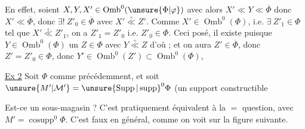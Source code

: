 
En effet, soient $X,Y,X'\in\operatorname{Omb}^{0}(\unsure{\Phi|\varphi})$ avec
alors $X'\ll Y\ll\overline\Phi$ donc $X'\ll\overline\Phi$, donc $\exists!\ Z'_0\in\overline\Phi$ avec $X'\overset{\circ}{\ll}Z'$. Comme $X'\in\operatorname{Omb}^{0}(\Phi)$, i.e. $\exists\ Z'_1\in\Phi$ tel que $X'\overset{\circ}{\ll}Z'_1$, on a $Z'_1=Z'_0$ i.e. $Z'_0\in\Phi$. Ceci posé, il existe puisque $Y\in\operatorname{Omb}^{0}(\Phi)$ un $Z\in\Phi$ avec $Y\overset{\circ}{\ll}Z$ d'où
; et on aura $Z'\in\overline\Phi$, donc $Z'=Z'_0\in\Phi$, donc $Y'\in\operatorname{Omb}^{0}(Z')\subset\operatorname{Omb}^{0}(\Phi)$, 

\uline{Ex 2} Soit $\Phi$ comme précédemment, et soit $\unsure{M'|\mathcal M'}=\unsure{\operatorname{Supp}|\operatorname{supp}}^{0}\Phi$ (un support constructible

Est-ce un sous-magasin ? C'est pratiquement équivalent à la $=$ question, avec $M'=\operatorname{cosupp}^{0}\Phi$.  C'est faux en général, comme on voit sur la figure suivante.

